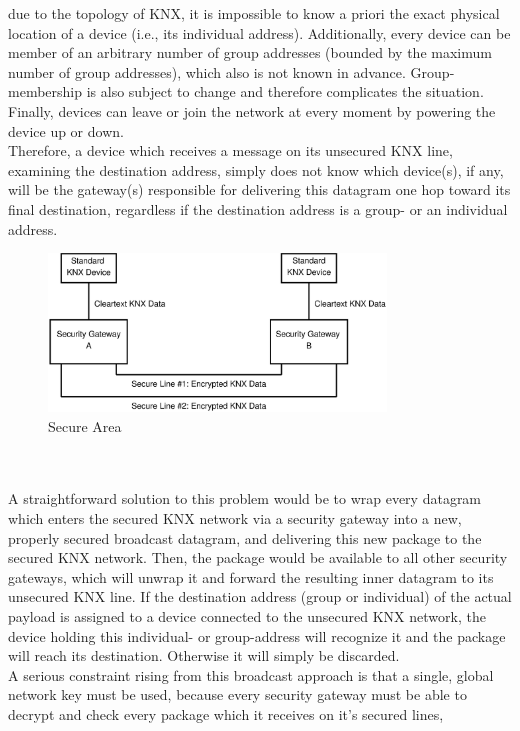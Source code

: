 due to the topology of KNX, it is impossible to know a priori the exact physical location of a device (i.e., its individual address). Additionally,
every device can be member of an arbitrary number of group addresses (bounded by the maximum number of group addresses), which also is not known in advance.
Group-membership is also subject to change and therefore complicates the situation. Finally, devices can leave or join the network at every moment by powering the
device up or down.
\\
Therefore, a device which receives a message on its unsecured KNX line, examining the destination address, simply does
not know which device(s), if any, will be the gateway(s) responsible for delivering this datagram one hop toward its final destination, regardless if the destination address
is a group- or an individual address.
\begin{figure}
    \centering
    \includegraphics[width=0.8\textwidth]{figures/SecureArea.eps}
    \caption{Secure Area}
    \label{fig:secArea}
\end{figure}
\\
\\
A straightforward solution to this problem would be to wrap every datagram which enters the secured KNX network via a security gateway into a new, properly secured
broadcast datagram, and delivering this new package to the secured KNX network. Then, the package would be available to all other security gateways, which
will unwrap it and forward the resulting inner datagram to its unsecured KNX line. If the destination address (group or individual) of the actual payload
is assigned to a device connected
to the unsecured KNX network, the device holding this individual- or group-address will recognize it and the package will reach its destination. 
Otherwise it will simply be discarded.
\\
A serious constraint rising from this broadcast approach is that a single,
global network key must be used, because every security gateway must be able to decrypt and check every package which it receives on it's secured lines,
